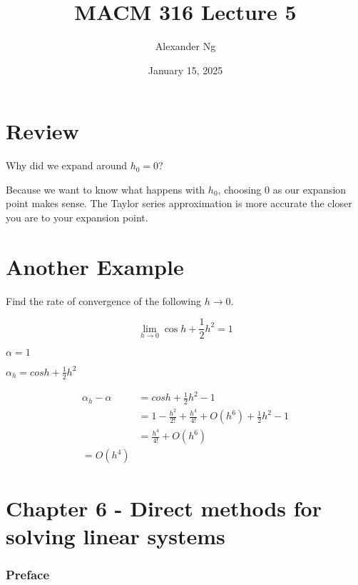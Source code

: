 \documentclass[12pt]{article}
\begin{document}
\renewcommand{\arraystretch}{1.25} %
\setlength{\arraycolsep}{12pt} 

\title{MACM 316 Lecture 5}
\author{Alexander Ng}
\date{January 15, 2025}

\maketitle

\section{Review}

Why did we expand around $h_0 = 0$?

\quad Because we want to know what happens with $h_0$, choosing $0$ as our 
expansion point makes sense. The Taylor series approximation is more accurate 
the closer you are to your expansion point.


\section{Another Example}

Find the rate of convergence of the following $h\to 0$.

\begin{equation*}
  \lim_{h \to 0} \cos h + \frac{1}{2} h^2 = 1
\end{equation*}

$\alpha = 1$

$\alpha_h = cos h + \frac{1}{2} h^2$

\begin{align*}
  \alpha_h - \alpha &= cos h + \frac{1}{2} h^2 - 1\\
  &= 1-\frac{h^2}{2!}+\frac{h^4}{4!} + O(h^6) + \frac{1}{2}h^2 - 1 \\
  &= \frac{h^4}{4!} + O(h^6) \\
  = O(h^4)
\end{align*}

\hline

\section{Chapter 6 - Direct methods for solving linear systems}

\subsubsection*{Preface}
\end{document}
